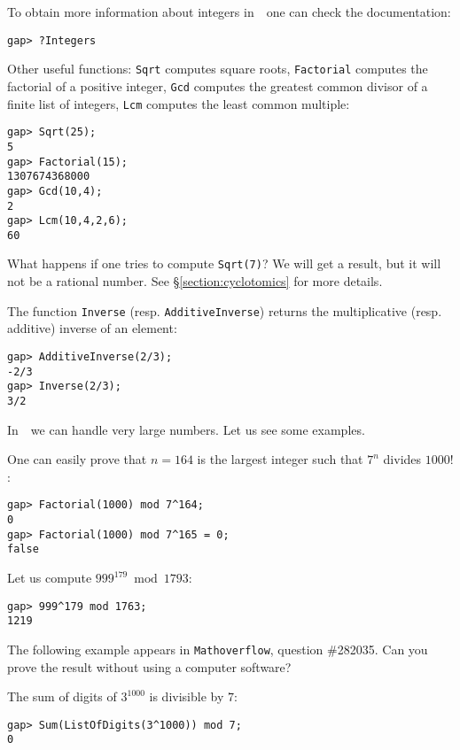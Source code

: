 To obtain more information about
integers in~\GAP~one can check the documentation:
\begin{lstlisting}
gap> ?Integers
\end{lstlisting}

Other useful functions: \lstinline{Sqrt} computes square roots, 
\lstinline{Factorial} computes the factorial of a positive integer, 
\lstinline{Gcd} computes the greatest common divisor of a finite list of integers, 
\lstinline{Lcm} computes the least common multiple: 
\begin{lstlisting}
gap> Sqrt(25);
5
gap> Factorial(15);
1307674368000
gap> Gcd(10,4);
2
gap> Lcm(10,4,2,6);
60
\end{lstlisting}

\begin{remark}
What happens if one tries
to compute \lstinline{Sqrt(7)}? We will get
a result, but it will not 
be a rational number. 
See \S\ref{section:cyclotomics} for more details.
\end{remark}

The function \lstinline{Inverse} (resp. \lstinline{AdditiveInverse}) returns 
the multiplicative (resp. additive) inverse of an element:
\begin{lstlisting}
gap> AdditiveInverse(2/3);
-2/3
gap> Inverse(2/3);
3/2
\end{lstlisting}

In~\GAP~we can handle very large numbers. 
Let us see some examples.

\begin{example}
	One can easily prove that $n=164$ is the largest integer such that $7^n$
	divides $1000!$:
\begin{lstlisting}
gap> Factorial(1000) mod 7^164;
0
gap> Factorial(1000) mod 7^165 = 0;
false
\end{lstlisting}
\end{example}

\begin{example}
Let us compute $999^{179}\bmod 1793$:
\begin{lstlisting}
gap> 999^179 mod 1763;
1219
\end{lstlisting}
\end{example}

The following example appears in \texttt{Mathoverflow}, question \#282035. Can you prove
the result without using a computer software?

\begin{example}
	The sum of digits of $3^{1000}$ is divisible by $7$: %
\begin{lstlisting}
gap> Sum(ListOfDigits(3^1000)) mod 7;
0
\end{lstlisting}
\end{example}


